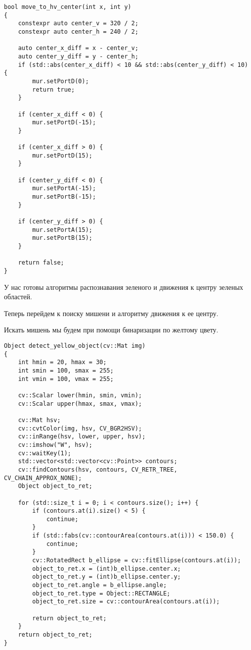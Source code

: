 \begin{verbatim}
bool move_to_hv_center(int x, int y)
{
    constexpr auto center_v = 320 / 2;
    constexpr auto center_h = 240 / 2;

    auto center_x_diff = x - center_v;
    auto center_y_diff = y - center_h;
    if (std::abs(center_x_diff) < 10 && std::abs(center_y_diff) < 10) {
        mur.setPortD(0);
        return true;
    }

    if (center_x_diff < 0) {
        mur.setPortD(-15);
    }

    if (center_x_diff > 0) {
        mur.setPortD(15);
    }

    if (center_y_diff < 0) {
        mur.setPortA(-15);
        mur.setPortB(-15);
    }

    if (center_y_diff > 0) {
        mur.setPortA(15);
        mur.setPortB(15);
    }

    return false;
}
\end{verbatim}

У нас готовы алгоритмы распознавания зеленого и движения к центру зеленых областей. 

Теперь перейдем к поиску мишени и алгоритму движения к ее центру. 

Искать мишень мы будем при помощи бинаризации по желтому цвету.

\begin{verbatim}
Object detect_yellow_object(cv::Mat img)
{
    int hmin = 20, hmax = 30;
    int smin = 100, smax = 255;
    int vmin = 100, vmax = 255;

    cv::Scalar lower(hmin, smin, vmin);
    cv::Scalar upper(hmax, smax, vmax);

    cv::Mat hsv;
    cv::cvtColor(img, hsv, CV_BGR2HSV);
    cv::inRange(hsv, lower, upper, hsv);
    cv::imshow("W", hsv);
    cv::waitKey(1);
    std::vector<std::vector<cv::Point>> contours;
    cv::findContours(hsv, contours, CV_RETR_TREE, CV_CHAIN_APPROX_NONE);
    Object object_to_ret;

    for (std::size_t i = 0; i < contours.size(); i++) {
        if (contours.at(i).size() < 5) {
            continue;
        }
        if (std::fabs(cv::contourArea(contours.at(i))) < 150.0) {
            continue;
        }
        cv::RotatedRect b_ellipse = cv::fitEllipse(contours.at(i));
        object_to_ret.x = (int)b_ellipse.center.x;
        object_to_ret.y = (int)b_ellipse.center.y;
        object_to_ret.angle = b_ellipse.angle;
        object_to_ret.type = Object::RECTANGLE;
        object_to_ret.size = cv::contourArea(contours.at(i));

        return object_to_ret;
    }
    return object_to_ret;
}
\end{verbatim}

